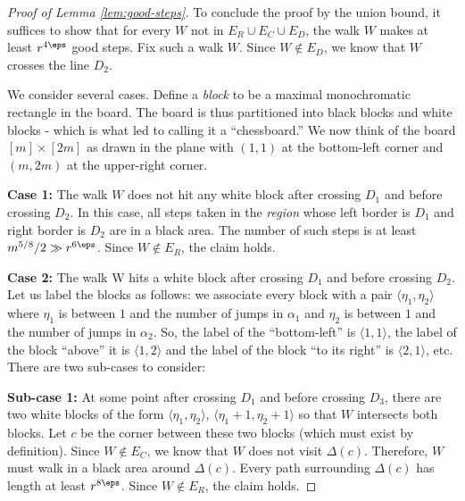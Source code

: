 \documentclass{article}
\begin{document}
\begin{proof}[Proof of Lemma \ref{lem:good-steps}]
To conclude the proof by the union bound, it suffices to show that for every $W$ not in $E_R \cup
E_C \cup E_D$, the walk $W$ makes at least $r^{4\eps}$ good steps. Fix such a walk $W$. Since $W \notin E_D$, we
know that $W$ crosses the line $D_2$. 


We consider several cases. Define a \emph{block} to be a maximal monochromatic rectangle in the board.
The board is thus partitioned into black blocks and white blocks - which is what led \cite{DvirMPY12} to calling it a  “chessboard.”
We now think of the board $[m] \times [2m]$ as drawn in the plane with $(1, 1)$ at the bottom-left corner and
$(m, 2m)$ at the upper-right corner.

\textbf{Case 1:}  The walk $W$ does not hit any white block after crossing $D_1$ and before crossing $D_2$.
In this case, all steps taken in the \emph{region} whose left border is $D_1$ and right border is $D_2$ are in a black
area. The number of such steps is at least $m^{5/8}/2\gg r^{6\eps}$. Since $W \notin E_R$, the claim holds.

\textbf{Case 2:}  The walk W hits a white block after crossing $D_1$ and before crossing $D_2$. Let us label the blocks as follows: we associate every block with a pair $\langle \eta_1, \eta_2\rangle$ where $\eta_1$ is between $1$ and the number of jumps in $\alpha_1$ and $\eta_2$ is between $1$ and the number of jumps
in $\alpha_2$. So, the label of the ``bottom-left'' is $\langle 1,1\rangle$, the label of the block ``above'' it is $\langle 1,2\rangle$ and the label of the block ``to its right'' is $\langle 2,1\rangle$, etc.  There are
two sub-cases to consider: 

\textbf{Sub-case 1:} At some point after crossing $D_1$ and before crossing $D_3$, there are two white blocks
of the form $\langle \eta_1, \eta_2\rangle$, $\langle\eta_1 + 1, \eta_2 + 1\rangle$ so that $W$ intersects
both blocks. Let $c$ be the corner between these two blocks (which must exist by definition). Since
$W \notin E_C$, we know that $W$ does not visit $\Delta(c)$. Therefore, $W$ must walk in a black area around
$\Delta(c)$. Every path surrounding $\Delta(c)$ has length at least $r^{8\eps}$. Since $W \notin E_R$, the claim holds.


\end{proof}
\end{document}
